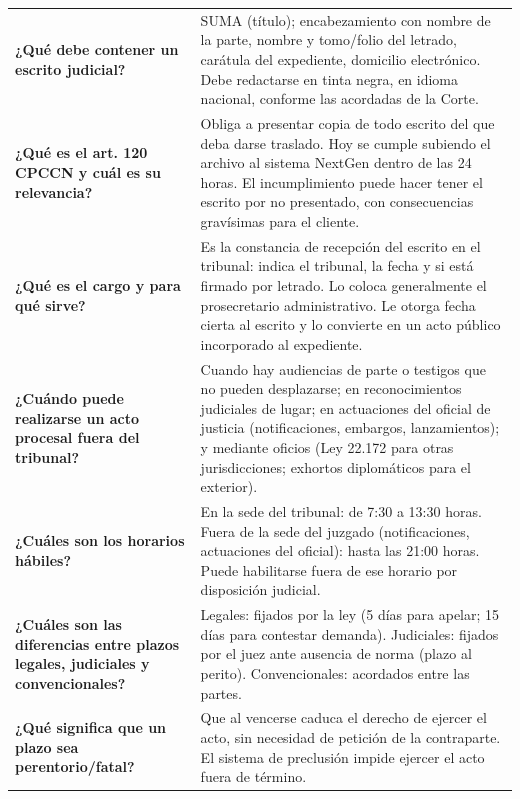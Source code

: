 \documentclass[12pt,oneside]{book}
\begin{document}
\begin{table}[H]
\begin{tabularx}{\textwidth}{
    >{\raggedright\arraybackslash}p{}
    >{\raggedright\arraybackslash}X
}
\textbf{¿Qué debe contener un escrito judicial?} &
SUMA (título); encabezamiento con nombre de la parte, nombre y tomo/folio del letrado, carátula del expediente, domicilio electrónico. Debe redactarse en tinta negra, en idioma nacional, conforme las acordadas de la Corte. \\[0.5em]

\textbf{¿Qué es el art. 120 CPCCN y cuál es su relevancia?} &
Obliga a presentar copia de todo escrito del que deba darse traslado. Hoy se cumple subiendo el archivo al sistema NextGen dentro de las 24 horas. El incumplimiento puede hacer tener el escrito por no presentado, con consecuencias gravísimas para el cliente. \\[0.5em]

\textbf{¿Qué es el cargo y para qué sirve?} &
Es la constancia de recepción del escrito en el tribunal: indica el tribunal, la fecha y si está firmado por letrado. Lo coloca generalmente el prosecretario administrativo. Le otorga fecha cierta al escrito y lo convierte en un acto público incorporado al expediente. \\[0.5em]

\textbf{¿Cuándo puede realizarse un acto procesal fuera del tribunal?} &
Cuando hay audiencias de parte o testigos que no pueden desplazarse; en reconocimientos judiciales de lugar; en actuaciones del oficial de justicia (notificaciones, embargos, lanzamientos); y mediante oficios (Ley 22.172 para otras jurisdicciones; exhortos diplomáticos para el exterior). \\[0.5em]

\textbf{¿Cuáles son los horarios hábiles?} &
En la sede del tribunal: de 7:30 a 13:30 horas. Fuera de la sede del juzgado (notificaciones, actuaciones del oficial): hasta las 21:00 horas. Puede habilitarse fuera de ese horario por disposición judicial. \\[0.5em]

\textbf{¿Cuáles son las diferencias entre plazos legales, judiciales y convencionales?} &
Legales: fijados por la ley (5 días para apelar; 15 días para contestar demanda). Judiciales: fijados por el juez ante ausencia de norma (plazo al perito). Convencionales: acordados entre las partes. \\[0.5em]

\textbf{¿Qué significa que un plazo sea perentorio/fatal?} &
Que al vencerse caduca el derecho de ejercer el acto, sin necesidad de petición de la contraparte. El sistema de preclusión impide ejercer el acto fuera de término. \\[0.5em]


\end{tabularx}
\end{table}
\end{document}
